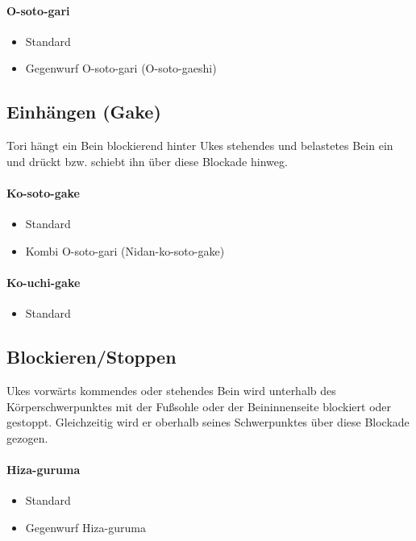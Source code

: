 \documentclass[justified, a4paper, notitlepage, captions=tableheading, nobib]{tufte-handout}
\begin{document}
\paragraph{O-soto-gari }
\label{sec:orge9453bb}
\begin{itemize}
\item Standard
\item Gegenwurf O-soto-gari (O-soto-gaeshi)
\end{itemize}

\subsection{Einhängen (Gake) }
\label{sec:org1534180}
Tori hängt ein Bein blockierend hinter Ukes stehendes und belastetes Bein ein und drückt bzw. schiebt ihn über diese Blockade hinweg.

\paragraph{Ko-soto-gake }
\label{sec:org4e209c3}
\begin{itemize}
\item Standard
\item Kombi O-soto-gari (Nidan-ko-soto-gake)
\end{itemize}

\paragraph{Ko-uchi-gake }
\label{sec:orgac25b68}
\begin{itemize}
\item Standard
\end{itemize}

\subsection{Blockieren/Stoppen }
\label{sec:org7abd299}
Ukes vorwärts kommendes oder stehendes Bein wird unterhalb des Körperschwerpunktes mit der Fußsohle oder der Beininnenseite blockiert oder gestoppt. Gleichzeitig wird er oberhalb seines Schwerpunktes über diese Blockade gezogen.

\paragraph{Hiza-guruma }
\label{sec:orgf74044f}
\begin{itemize}
\item Standard
\item Gegenwurf Hiza-guruma
\end{itemize}
\end{document}
